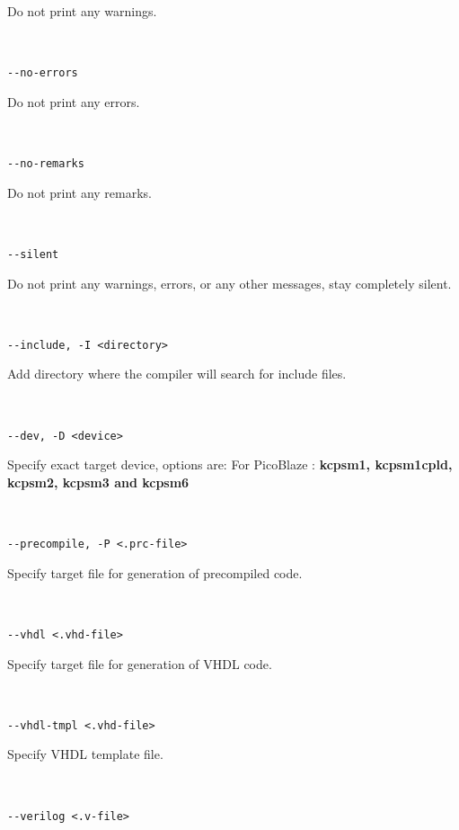             Do not print any warnings.
             {
            ~\\
            \usecodefont
            
            \verb'--no-errors'\\
            }
            Do not print any errors.
             {
            ~\\
            \usecodefont
            
            \verb'--no-remarks'\\
            }
            Do not print any remarks.
             {
            ~\\
            \usecodefont
            
            \verb'--silent'\\
            }
            Do not print any warnings, errors, or any other messages, stay completely silent.
             {
            ~\\
            \usecodefont
            
            \verb'--include, -I <directory>'\\
            }
            Add directory where the compiler will search for include files.
             {
            ~\\
            \usecodefont
            
            \verb'--dev, -D <device>'\\
            }
            Specify exact target device, options are:
            For PicoBlaze : \textbf{kcpsm1, kcpsm1cpld, kcpsm2, kcpsm3 and kcpsm6}
            {
            ~\\
            \usecodefont

            \verb'--precompile, -P <.prc-file>'\\
            }
            Specify target file for generation of precompiled code.
             {
            ~\\
            \usecodefont

            \verb'--vhdl <.vhd-file>'\\
            }
            Specify target file for generation of VHDL code.
             {
            ~\\
            \usecodefont

            \verb'--vhdl-tmpl <.vhd-file>'\\
            }
             Specify VHDL template file.
             {
            ~\\
            \usecodefont

            \verb'--verilog <.v-file>'\\
            }
